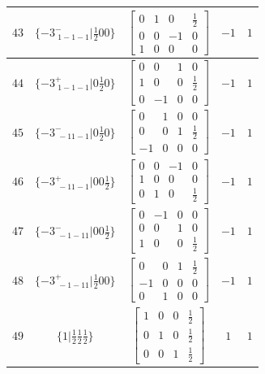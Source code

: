 \documentclass[fleqn,8pt]{jsarticle}
\begin{document}
\begin{longtable}{ccccc}
$ 43 $ & $ \{-3^{-}_{\,\,1-1-1}|\frac{1}{2} 0 0\} $ & $ \begin{bmatrix} 0 & 1 & 0 & \frac{1}{2} \\ 0 & 0 & -1 & 0 \\ 1 & 0 & 0 & 0 \end{bmatrix} $ & $ -1 $ & $ 1 $ \\ \hline
$ 44 $ & $ \{-3^{+}_{\,\,1-1-1}|0 \frac{1}{2} 0\} $ & $ \begin{bmatrix} 0 & 0 & 1 & 0 \\ 1 & 0 & 0 & \frac{1}{2} \\ 0 & -1 & 0 & 0 \end{bmatrix} $ & $ -1 $ & $ 1 $ \\ \hline
$ 45 $ & $ \{-3^{-}_{\,\,-11-1}|0 \frac{1}{2} 0\} $ & $ \begin{bmatrix} 0 & 1 & 0 & 0 \\ 0 & 0 & 1 & \frac{1}{2} \\ -1 & 0 & 0 & 0 \end{bmatrix} $ & $ -1 $ & $ 1 $ \\ \hline
$ 46 $ & $ \{-3^{+}_{\,\,-11-1}|0 0 \frac{1}{2}\} $ & $ \begin{bmatrix} 0 & 0 & -1 & 0 \\ 1 & 0 & 0 & 0 \\ 0 & 1 & 0 & \frac{1}{2} \end{bmatrix} $ & $ -1 $ & $ 1 $ \\ \hline
$ 47 $ & $ \{-3^{-}_{\,\,-1-11}|0 0 \frac{1}{2}\} $ & $ \begin{bmatrix} 0 & -1 & 0 & 0 \\ 0 & 0 & 1 & 0 \\ 1 & 0 & 0 & \frac{1}{2} \end{bmatrix} $ & $ -1 $ & $ 1 $ \\ \hline
$ 48 $ & $ \{-3^{+}_{\,\,-1-11}|\frac{1}{2} 0 0\} $ & $ \begin{bmatrix} 0 & 0 & 1 & \frac{1}{2} \\ -1 & 0 & 0 & 0 \\ 0 & 1 & 0 & 0 \end{bmatrix} $ & $ -1 $ & $ 1 $ \\ \hline
$ 49 $ & $ \{1|\frac{1}{2} \frac{1}{2} \frac{1}{2}\} $ & $ \begin{bmatrix} 1 & 0 & 0 & \frac{1}{2} \\ 0 & 1 & 0 & \frac{1}{2} \\ 0 & 0 & 1 & \frac{1}{2} \end{bmatrix} $ & $ 1 $ & $ 1 $ \\ \hline

\end{longtable}
\end{document}
